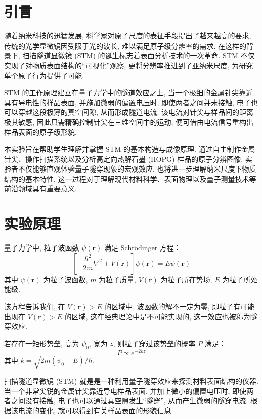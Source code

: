 \documentclass{whureport}
\begin{document}
\begin{multicols}{2}
\section{引言}
随着纳米科技的迅猛发展, 科学家对原子尺度的表征手段提出了越来越高的要求, 传统的光学显微镜因受限于光的波长, 难以满足原子级分辨率的需求. 在这样的背景下, 扫描隧道显微镜 (STM) 的诞生标志着表面分析技术的一次革命. STM 不仅实现了对物质表面结构的“可视化”观察, 更将分辨率推进到了亚纳米尺度, 为研究单个原子行为提供了可能.

STM 的工作原理建立在量子力学中的隧道效应之上, 当一个极细的金属针尖靠近具有导电性的样品表面, 并施加微弱的偏置电压时, 即使两者之间并未接触, 电子也可以穿越这段极薄的真空间隙, 从而形成隧道电流. 该电流对针尖与样品间的距离极其敏感, 因此只需精确控制针尖在三维空间中的运动, 便可借由电流信号重构出样品表面的原子级形貌.

本实验旨在帮助学生理解并掌握 STM 的基本构造与成像原理. 通过自主制作金属针尖、操作扫描系统以及分析高定向热解石墨 (HOPG) 样品的原子分辨图像, 实验者不仅能够直观体验量子隧穿现象的宏观效应, 也将进一步理解纳米尺度下物质结构的基本特性. 这一过程对于理解现代材料科学、表面物理以及量子测量技术等前沿领域具有重要意义.

\section{实验原理}
量子力学中, 粒子波函数 \( \psi(\mathbf{r}) \) 满足 Schrödinger 方程：
\[ \left[ -\frac{\hbar^2}{2m}\nabla^2 + V(\mathbf{r}) \right] \psi(\mathbf{r}) = E\psi(\mathbf{r}) \] %
其中 \( \psi(\mathbf{r}) \) 为粒子波函数, \( m \) 为粒子质量, \( V(\mathbf{r}) \) 为粒子所在势场, \( E \) 为粒子所处能级.

该方程告诉我们, 在 \( V(\mathbf{r}) > E \) 的区域中, 波函数的解不一定为零, 即粒子有可能出现在 \( V(\mathbf{r}) > E \) 的区域, 这在经典理论中是不可能实现的, 这一效应也被称为隧穿效应.

若存在一矩形势垒, 高为 \( \psi_0 \), 宽为 \( z \), 则粒子穿过该势垒的概率 \( P \) 满足：
\[ P \propto e^{-2kz} \] %
其中 \( k = \sqrt{2m(\psi_0 - E)}/\hbar \).

扫描隧道显微镜 (STM) 就是是一种利用量子隧穿效应来探测材料表面结构的仪器. 当一个非常尖锐的金属针尖靠近导电样品表面, 并加上微小的偏置电压时, 即使两者之间没有接触, 电子也可以通过真空隙发生“隧穿”, 从而产生微弱的隧穿电流. 根据该电流的变化, 就可以得到有关样品表面的形貌信息.


\end{multicols}
\end{document}
